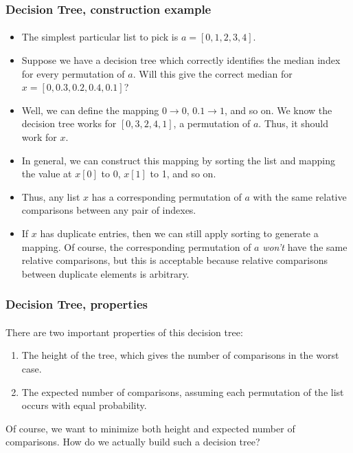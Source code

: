 \documentclass{beamer}                             %
\begin{document}
\begin{frame}
\frametitle{Decision Tree, construction example}
\framesubtitle{}
\begin{itemize}[<+->]
  \item The simplest particular list to pick is \( a = [0, 1, 2, 3, 4] \).
  \item Suppose we have a decision tree which correctly identifies
    the median index for every permutation of \( a \). Will this
    give the correct median for \( x = [0, 0.3, 0.2, 0.4, 0.1] \)?
  \item Well, we can define the mapping \( 0 \rightarrow 0 \),
    \( 0.1 \rightarrow 1 \), and so on. We know the decision tree works for
    \( [0, 3, 2, 4, 1] \), a permutation of \( a \).
    Thus, it should work for \( x \).
  \item In general, we can construct this mapping by sorting the list
    and mapping the value at \( x[0] \) to 0, \( x[1] \) to 1, and so on.
  \item Thus, any list \( x \) has a corresponding permutation of \( a \)
    with the same relative comparisons between any pair of indexes.
  \item If \( x \) has duplicate entries, then we can still apply sorting to
    generate a mapping. Of course, the corresponding permutation of \( a \)
    \emph{won't} have the same relative comparisons, but this is acceptable
    because relative comparisons between duplicate elements is arbitrary.
\end{itemize}
\end{frame}

\begin{frame}
\frametitle{Decision Tree, properties}
\framesubtitle{}
There are two important properties of this decision tree:
\begin{enumerate}
  \item The height of the tree, which gives the number of comparisons in the
    worst case.
  \item The expected number of comparisons, assuming each permutation
    of the list occurs with equal probability. 
\end{enumerate} \pause
Of course, we want to minimize both height and expected number of comparisons.
How do we actually build such a decision tree?
\end{frame}
\end{document}
